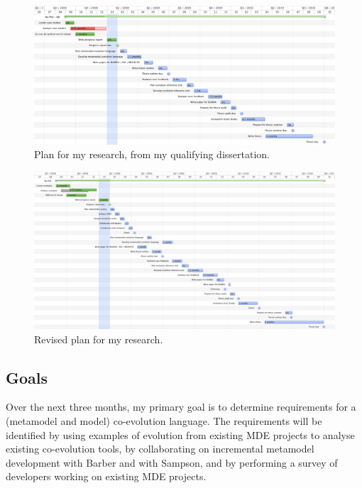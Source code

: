 \begin{landscape}

\begin{figure}[htbp]
  \begin{center}
    \leavevmode
    \includegraphics[scale=0.5]{old_plan.png}
  \end{center}
  \caption{Plan for my research, from my qualifying dissertation.}
  \label{fig:old_plan}
\end{figure}

\begin{figure}[ht]
  \begin{center}
    \leavevmode
    \includegraphics[scale=0.42]{revised_plan.png}
  \end{center}
  \caption{Revised plan for my research.}
  \label{fig:revised_plan}
\end{figure}

\end{landscape}


\subsection{Goals} %
\label{sub:goals}
Over the next three months, my primary goal is to determine requirements for a (metamodel and model) co-evolution language. The requirements will be identified by using examples of evolution from existing MDE projects to analyse existing co-evolution tools, by collaborating on incremental metamodel development with Barber and with Sampson, and by performing a survey of developers working on existing MDE projects.

